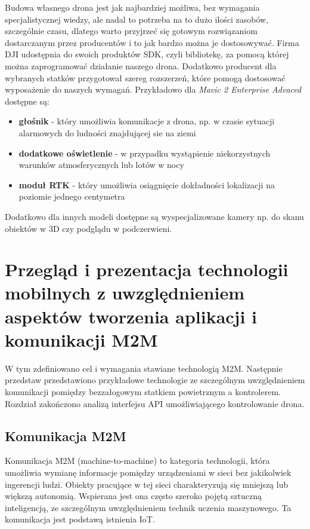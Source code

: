 Budowa własnego drona jest jak najbardziej możliwa, bez wymagania specjalistycznej wiedzy, ale nadal to potrzeba na to dużo ilości zasobów, szczególnie czasu, dlatego warto przyjrzeć się gotowym rozwiązaniom dostarczanym przez producentów i to jak bardzo można je dostosowywać. Firma DJI udostępnia do swoich produktów SDK, czyli bibliotekę, za pomocą której można zaprogramować działanie naszego drona. Dodatkowo producent dla wybranych statków przygotował szereg rozszerzeń, które pomogą dostosować wyposażenie do naszych wymagań. Przykładowo dla \textit{Mavic 2 Enterprise Advaced} dostępne są:
\begin{itemize}
  \item \textbf{głośnik} - który umożliwia komunikacje z drona, np. w czasie sytuacji alarmowych do ludności znajdującej sie na ziemi
  \item \textbf{dodatkowe oświetlenie} - w przypadku wystąpienie niekorzystnych warunków atmosferycznych lub lotów w nocy
  \item \textbf{moduł RTK} - który umożliwia osiągnięcie dokładności lokalizacji na poziomie jednego centymetra
\end{itemize}
Dodatkowo dla innych modeli dostępne są wyspecjalizowane kamery np. do skanu obiektów w 3D czy podglądu w podczerwieni.

\newpage 
\section{Przegląd i prezentacja technologii mobilnych z uwzględnieniem aspektów tworzenia aplikacji i komunikacji M2M}
W tym zdefiniowano cel i wymagania stawiane technologią M2M. Następnie przedstaw przedstawiono przykładowe technologie ze szczególnym uwzględnieniem komunikacji pomiędzy bezzałogowym statkiem powietrznym a kontrolerem. Rozdział zakończono analizą interfejsu API umożliwiającego kontrolowanie drona.

\subsection{Komunikacja M2M}
Komunikacja M2M (machine-to-machine) to kategoria technologii, która umożliwia wymianę informacje pomiędzy urządzeniami w sieci bez jakikolwiek ingerencji ludzi. Obiekty pracujące w tej sieci charakteryzują się mniejszą lub większą autonomią. Wspierana jest ona często szeroko pojętą sztuczną inteligencją, ze szczególnym uwzględnieniem technik uczenia maszynowego. Ta komunikacja jest podstawą istnienia IoT.\cite{m2m-web}

